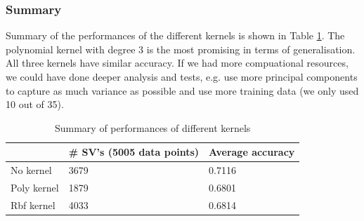 \subsubsection{Summary}
Summary of the performances of the different kernels is shown in Table \ref{table:svmResults}. The polynomial kernel with degree 3 is the most promising in terms of generalisation. All three kernels have similar accuracy. If we had more compuational resources, we could have done deeper analysis and tests, e.g. use more principal components to capture as much variance as possible and use more training data (we only used 10 out of 35).

\begin{table}[h]
	\centering
	\begin{tabular}{@{}lll@{}}
	\toprule
	            & \# SV's (5005 data points) & Average accuracy \\ \midrule
	No kernel   & 3679                       & 0.7116           \\
	Poly kernel & 1879                       & 0.6801           \\
	Rbf kernel  & 4033                       & 0.6814           \\ \bottomrule
	\end{tabular}
	\caption{Summary of performances of different kernels}
	\label{table:svmResults}
\end{table}